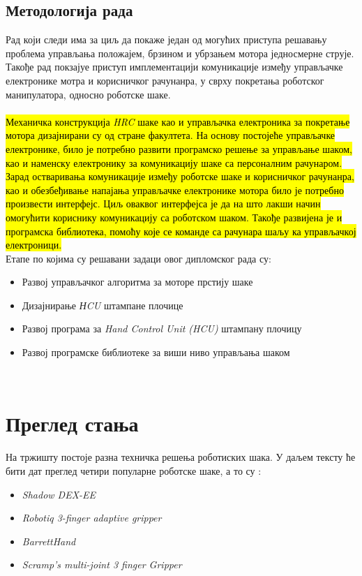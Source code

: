 \documentclass{article}
\begin{document}
\subsection{Методологија рада}
Рад који следи има за циљ да покаже један од могућих приступа решавању проблема 
управљања положајем, брзином и убрзањем мотора једносмерне струје. Такође рад покзајуе 
приступ имплементацији комуникације између
управљачке електронике мотра и корисничког рачунанра, у сврху покретања роботског 
манипулатора, односно роботске шаке. \\
\ \\
\hl{Механичка конструкција \textit{HRC} шаке као и 
управљачка електроника за покретање мотора дизајнирани су 
од стране факултета. На основу постојеће управљачке електронике, било је потребно развити програмско решење 
за управљање шаком, као и наменску електронику за комуникацију шаке са персоналним рачунаром.
Зарад остваривања комуникације између роботске шаке и корисничког рачунанра, као и обезбеђивање
напајања управљачке електронике мотора било је
потребно произвести интерфејс. Циљ оваквог интерфејса је да на што лакши
начин омогућити кориснику комуникацију са роботском шаком. Такође развијена је и 
програмска библиотека, помоћу које се команде са рачунара шаљу ка управљачкој електроници.}\\
Етапе по којима су решавани задаци овог дипломског рада су:
\begin{itemize}
    \item Развој управљачког алгоритма за моторе прстију шаке
    \item Дизајнирање \textit{НCU} штампане плочице 
    \item Развој програма за \textit{Hand Control Unit (HCU)} штампану плочицу
    \item Развој програмске библиотеке за виши ниво управљања шаком
\end{itemize}
\ \\
\clearpage
\section{Преглед стања}
На тржишту постоје разна техничка решења роботиских шака. У даљем тексту ће
бити дат преглед четири популарне роботске шаке, а то су : 
\begin{itemize}
    \item \textit{Shadow DEX-EE} \cite{shadow_rob}
    \item \textit{Robotiq 3-finger adaptive gripper} \cite{robotique}
    \item \textit{BarrettHand} \cite{barret}
    \item \textit{Scramp’s multi-joint 3 finger Gripper} \cite{scram}
\end{itemize}
\end{document}

